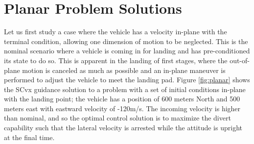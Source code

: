 \documentclass[conf]{new-aiaa}
\begin{document}
\section{Planar Problem Solutions}
Let us first study a case where the vehicle has a velocity in-plane with the terminal condition, allowing one dimension of motion to be neglected. This is the nominal scenario where a vehicle is coming in for landing and has pre-conditioned its state to do so. This is apparent in the landing of first stages, where the out-of-plane motion is canceled as much as possible and an in-plane maneuver is performed to adjust the vehicle to meet the landing pad. Figure \ref{fig:planar} shows the SCvx guidance solution to a problem with a set of initial conditions in-plane with the landing point; the vehicle has a position of 600 meters North and 500 meters east with eastward velocity of -120m/s. The incoming velocity is higher than nominal, and so the optimal control solution is to maximize the divert capability such that the lateral velocity is arrested while the attitude is upright at the final time.
\end{document}
